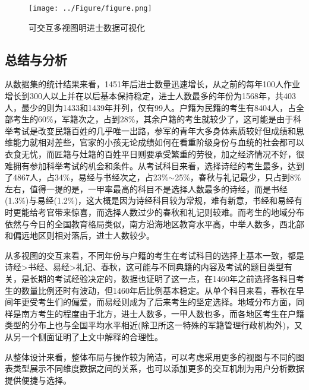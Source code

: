 \documentclass[11pt]{article}
\begin{document}
	\begin{figure}[H]
		\centering
		\texttt{[image: ../Figure/figure.png]}
		\caption{可交互多视图明进士数据可视化}
	\end{figure}
	
	
	\subsection{总结与分析}
	从数据集的统计结果来看，1451年后进士数量迅速增长，从之前的每年100人作业增长到300人以上并在以后基本保持稳定，进士人数最多的年份为1568年，共403人，最少的则为1433和1439年并列，仅有99人。户籍为民籍的考生有8404人，占全部考生的60\%，军籍次之，占到28\%，其余户籍的考生就较少了，这可能是由于科举考试是改变民籍百姓的几乎唯一出路，参军的青年大多身体素质较好但成绩和思维能力就相对差些，官家的小孩无论成绩如何在看重阶级身份与血统的社会都可以衣食无忧，而匠籍与灶籍的百姓平日则要承受繁重的劳役，加之经济情况不好，很难拥有参加科举考试的机会和条件。从考试科目来看，选择诗经的考生最多，达到了4867人，占34\%，易经与书经次之，占23\%$\sim$25\%，春秋与礼记最少，只占到8\%左右，值得一提的是，一甲率最高的科目不是选择人数最多的诗经，而是书经(1.3\%)与易经(1.2\%)，这大概是因为诗经科目较为常规，难有新意，书经和易经有时更能给考官带来惊喜，而选择人数过少的春秋和礼记则较难。而考生的地域分布依然与今日的全国教育格局类似，南方沿海地区教育水平高，中举人数多，西北部和偏远地区则相对落后，进士人数较少。
	
	从多视图的交互来看，不同年份与户籍的考生在考试科目的选择上基本一致，都是诗经>书经、易经>礼记、春秋，这可能与不同典籍的内容及考试的题目类型有关，是长期的考试经验决定的，数据也证明了这一点，在1460年之前选择各科目考生的数量比例还时有波动，但1460年后比例基本稳定。从单个科目来看，春秋在早间年更受考生们的偏爱，而易经则成为了后来考生的坚定选择。地域分布方面，同样是南方考生的程度由于北方，进士人数多，一甲人数也多，而各地区考生在户籍类型的分布上也与全国平均水平相近(除卫所这一特殊的军籍管理行政机构外)，又从另一个侧面证明了上文中解释的合理性。
	
	从整体设计来看，整体布局与操作较为简洁，可以考虑采用更多的视图与不同的图表类型展示不同维度数据之间的关系，也可以添加更多的交互机制为用户分析数据提供便捷与选择。
	
\end{document}
